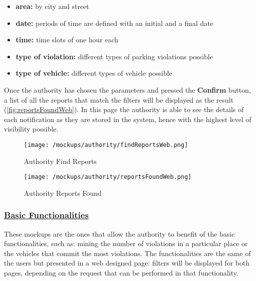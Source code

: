 				\begin{itemize}
					\item \textbf{area:} by city and street
					\item \textbf{date:} periods of time are defined with an initial and a final date
					\item \textbf{time:} time slots of one hour each
					\item \textbf{type of violation:} different types of parking violations possible
					\item \textbf{type of vehicle:} different types of vehicle possible
				\end{itemize} 
			
				Once the authority has chosen the parameters and pressed the \textbf{Confirm} button, a list of all the reports that match the filters will be displayed as the result (\autoref{fig:reportsFoundWeb}). In this page the authority is able to see the details of each notification as they are stored in the system, hence with the highest level of visibility possible.\\
				
				\newpage
				
				\begin{figure}[ht!]
					\centering
					\texttt{[image: /mockups/authority/findReportsWeb.png]}
					\caption{\label{fig:findReportsWeb} Authority Find Reports}
				\end{figure}
			
				\vspace{1cm}
			
				\begin{figure}[ht!]
					\centering
					\texttt{[image: /mockups/authority/reportsFoundWeb.png]}
					\caption{\label{fig:reportsFoundWeb} Authority Reports Found}
				\end{figure}
			
				\newpage
			
			\subsubsection[Basic Functionalities]{\hyperlink{toc}{Basic Functionalities}}
				\label{sec:authorityBasicFunctionalities}
				
				These mockups are the ones that allow the authority to benefit of the basic functionalities, such as: mining the number of violations in a particular place or the vehicles that commit the most violations. The functionalities are the same of the users but presented in a web designed page: filters will be displayed for both pages, depending on the request that can be performed in that functionality.
				
